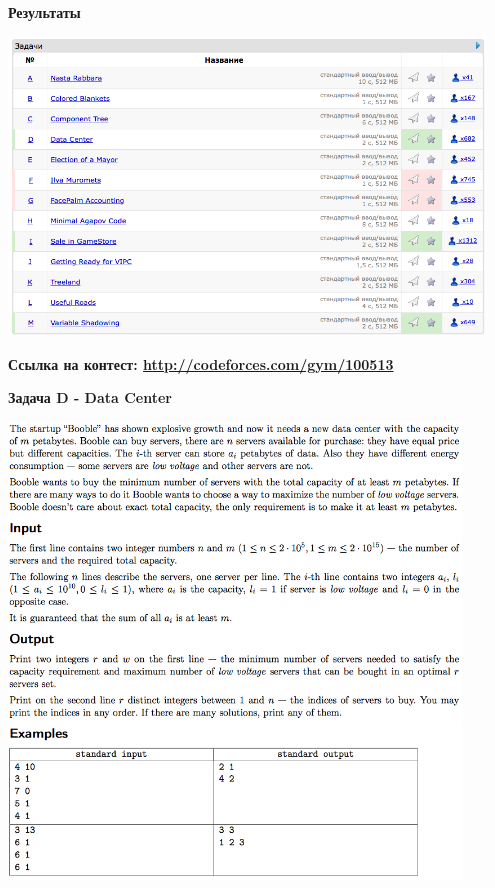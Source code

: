 \documentclass[a4paper,12pt]{article}
\begin{document}
\textbf{{\large Результаты}} \\
\begin{center}
\includegraphics[width=0.95\textwidth]{CT_ACM_WEST/CT_ACM_WEST_result.png}\\ [1cm]
\end{center}

\textbf{{\large Ссылка на контест: \url{http://codeforces.com/gym/100513}}}

\newpage
\textbf{{\large Задача D - Data Center}}

\begin{center}
\includegraphics[width=0.9\textwidth]{CT_ACM_WEST/CT_ACM_WEST_D.png}\\ [1cm]
\end{center}
\end{document}
